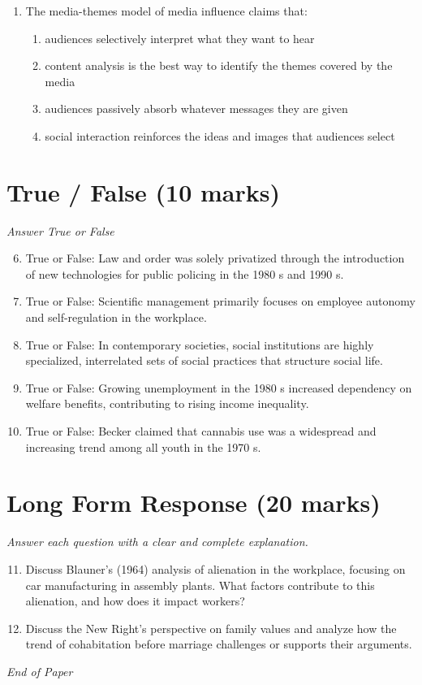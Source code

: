 \documentclass[12pt]{article}
\begin{document}
\begin{enumerate}[label=\arabic*.]
\begin{enumerate}[label=(\alph*)]
    \item A preschool provider
    \item A peer group
    \item The mass media
    \item The family
\end{enumerate}
\item The media-themes model of media influence claims that:
\begin{enumerate}[label=(\alph*)]
    \item audiences selectively interpret what they want to hear
    \item content analysis is the best way to identify the themes covered by the media
    \item audiences passively absorb whatever messages they are given
    \item social interaction reinforces the ideas and images that audiences select
\end{enumerate}
\end{enumerate}

\section*{True / False (10 marks)}
\textit{Answer True or False}
\begin{enumerate}[label=\arabic*.]
\setcounter{enumi}{5}
\item True or False: Law and order was solely privatized through the introduction of new technologies for public policing in the 1980 s and 1990 s.
\item True or False: Scientific management primarily focuses on employee autonomy and self-regulation in the workplace.
\item True or False: In contemporary societies, social institutions are highly specialized, interrelated sets of social practices that structure social life.
\item True or False: Growing unemployment in the 1980 s increased dependency on welfare benefits, contributing to rising income inequality.
\item True or False: Becker claimed that cannabis use was a widespread and increasing trend among all youth in the 1970 s.
\end{enumerate}

\section*{Long Form Response (20 marks)}
\textit{Answer each question with a clear and complete explanation.}
\begin{enumerate}[label=\arabic*.]
\setcounter{enumi}{10}
\item Discuss Blauner's (1964) analysis of alienation in the workplace, focusing on car manufacturing in assembly plants. What factors contribute to this alienation, and how does it impact workers?
\item Discuss the New Right's perspective on family values and analyze how the trend of cohabitation before marriage challenges or supports their arguments.
\end{enumerate}

\vfill
\noindent\textit{End of Paper}
\end{document}
